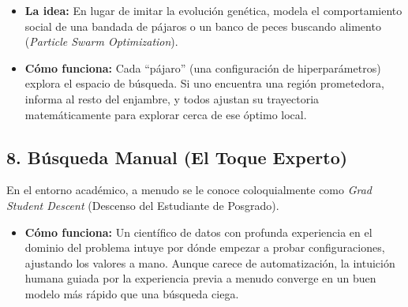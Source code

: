 \begin{itemize}
    \item \textbf{La idea:} En lugar de imitar la evolución genética, modela el comportamiento social de una bandada de pájaros o un banco de peces buscando alimento (\textit{Particle Swarm Optimization}).
    \item \textbf{Cómo funciona:} Cada ``pájaro'' (una configuración de hiperparámetros) explora el espacio de búsqueda. Si uno encuentra una región prometedora, informa al resto del enjambre, y todos ajustan su trayectoria matemáticamente para explorar cerca de ese óptimo local.
\end{itemize}

\subsection{8. Búsqueda Manual (El Toque Experto)}
En el entorno académico, a menudo se le conoce coloquialmente como \textit{Grad Student Descent} (Descenso del Estudiante de Posgrado).

\begin{itemize}
    \item \textbf{Cómo funciona:} Un científico de datos con profunda experiencia en el dominio del problema intuye por dónde empezar a probar configuraciones, ajustando los valores a mano. Aunque carece de automatización, la intuición humana guiada por la experiencia previa a menudo converge en un buen modelo más rápido que una búsqueda ciega.
\end{itemize}

\vspace{0.5cm}

